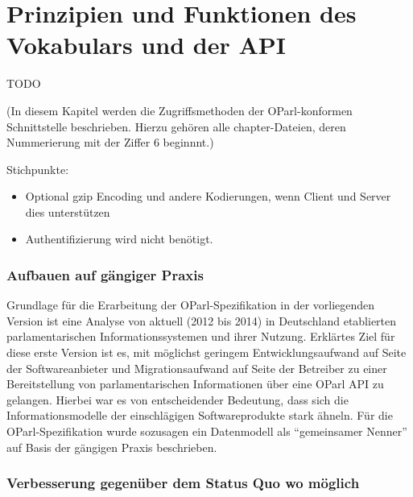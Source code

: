 \documentclass[,a4paper]{article}
\begin{document}
\section{Prinzipien und Funktionen des Vokabulars und der
API}\label{prinzipien-und-funktionen-des-vokabulars-und-der-api}

TODO

(In diesem Kapitel werden die Zugriffsmethoden der OParl-konformen
Schnittstelle beschrieben. Hierzu gehören alle chapter-Dateien, deren
Nummerierung mit der Ziffer 6 beginnnt.)

Stichpunkte:

\begin{itemize}
\itemsep1pt\parskip0pt
\item
  Optional gzip Encoding und andere Kodierungen, wenn Client und Server
  dies unterstützen
\item
  Authentifizierung wird nicht benötigt.
\end{itemize}


\subsubsection{Aufbauen auf gängiger
Praxis}\label{aufbauen-auf-guxe4ngiger-praxis}

Grundlage für die Erarbeitung der OParl-Spezifikation in der
vorliegenden Version ist eine Analyse von aktuell (2012 bis 2014) in
Deutschland etablierten parlamentarischen Informationssystemen und ihrer
Nutzung. Erklärtes Ziel für diese erste Version ist es, mit möglichst
geringem Entwicklungsaufwand auf Seite der Softwareanbieter und
Migrationsaufwand auf Seite der Betreiber zu einer Bereitstellung von
parlamentarischen Informationen über eine OParl API zu gelangen. Hierbei
war es von entscheidender Bedeutung, dass sich die Informationsmodelle
der einschlägigen Softwareprodukte stark ähneln. Für die
OParl-Spezifikation wurde sozusagen ein Datenmodell als ``gemeinsamer
Nenner'' auf Basis der gängigen Praxis beschrieben.

\subsubsection{Verbesserung gegenüber dem Status Quo wo
möglich}\label{verbesserung-gegenuxfcber-dem-status-quo-wo-muxf6glich}
\end{document}
